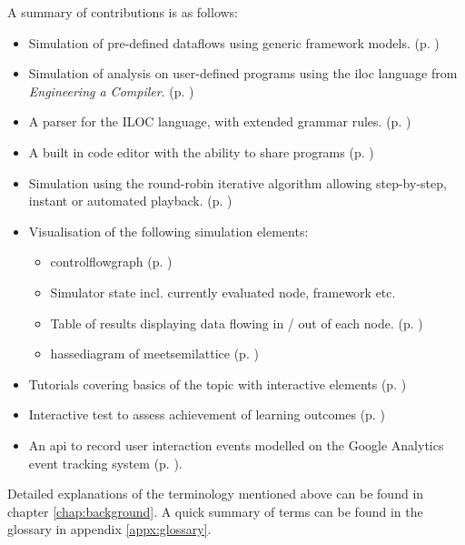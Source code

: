 \documentclass[bsc,twoside,singlespacing,parskip,logo,notimes,normalheadings]{infthesis}
\begin{document}
    A summary of contributions is as follows:
    
    \begin{itemize}[leftmargin=7mm]
    \item Simulation of pre-defined \gls{dataflow}s using generic
      framework models. (p. \pageref{sec:impl-dataflows})
    \item Simulation of analysis on user-defined programs using the
      \gls{iloc}\cite[appx.~A]{eac} \break language from {\em Engineering a
        Compiler}. (p. \pageref{sec:impl-iloc})
    \item A parser for the ILOC language, with extended grammar
      rules. (p. \pageref{sec:peg})
    \item A built in code editor with the ability to share programs (p. \pageref{sec:code-display})
    \item Simulation using the round-robin iterative algorithm
      allowing step-by-step, instant or automated
      playback. (p. \pageref{sec:impl-simulation})
    \item Visualisation of the following simulation elements:
      \begin{itemize}
      \item \Gls{controlflowgraph} (p. \pageref{sec:impl-visual-cfg})
      \item Simulator state incl. currently evaluated node,
        framework etc.
      \item Table of results displaying data flowing in / out of each
        node. (p. \pageref{sec:impl-visual-results})
      \item \Gls{hassediagram} of \gls{meetsemilattice}
        (p. \pageref{sec:impl-visual-hasse})
      \end{itemize}
    \item Tutorials covering basics of the topic with interactive
      elements (p. \pageref{sec:impl-tutorials})
    \item Interactive test to assess achievement of learning outcomes
      (p. \pageref{sec:impl-testing})
    \item An \gls{api} to record user interaction events modelled on
      the Google Analytics event tracking system
      (p. \pageref{sec:impl-tracking-api}).
    \end{itemize}

    Detailed explanations of the terminology mentioned above can be
    found in chapter \ref{chap:background}. A quick summary of terms
    can be found in the glossary in appendix \ref{appx:glossary}.
\end{document}

